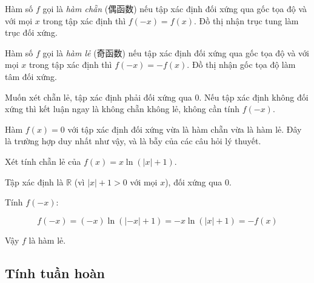 \documentclass[11pt, a4paper]{article}
\begin{document}
\begin{dinhnghia}
Hàm số $f$ gọi là \emph{hàm chẵn} (偶函数) nếu tập xác định đối xứng qua gốc tọa độ và với mọi $x$ trong tập xác định thì $f(-x) = f(x)$. Đồ thị nhận trục tung làm trục đối xứng.
\end{dinhnghia}
\begin{dinhnghia}[{5 — Hàm số lẻ}]
Hàm số $f$ gọi là \emph{hàm lẻ} (奇函数) nếu tập xác định đối xứng qua gốc tọa độ và với mọi $x$ trong tập xác định thì $f(-x) = -f(x)$. Đồ thị nhận gốc tọa độ làm tâm đối xứng.
\end{dinhnghia}
\begin{dinhly}
Muốn xét chẵn lẻ, tập xác định phải đối xứng qua $0$. Nếu tập xác định không đối xứng thì kết luận ngay là không chẵn không lẻ, không cần tính $f(-x)$.
\end{dinhly}
\begin{dinhly}

 Hàm $f(x) = 0$ với tập xác định đối xứng vừa là hàm chẵn vừa là hàm lẻ. Đây là trường hợp duy nhất như vậy, và là bẫy của các câu hỏi lý thuyết.
\end{dinhly}
\begin{vidu}[{2}]
Xét tính chẵn lẻ của $f(x) = x\ln(|x| + 1)$.

Tập xác định là $\mathbb{R}$ (vì $|x| + 1 > 0$ với mọi $x$), đối xứng qua $0$.

Tính $f(-x)$:

$$f(-x) = (-x)\ln(|-x| + 1) = -x\ln(|x| + 1) = -f(x)$$

Vậy $f$ là hàm lẻ.

\end{vidu}
\subsection{Tính tuần hoàn}
\end{document}
